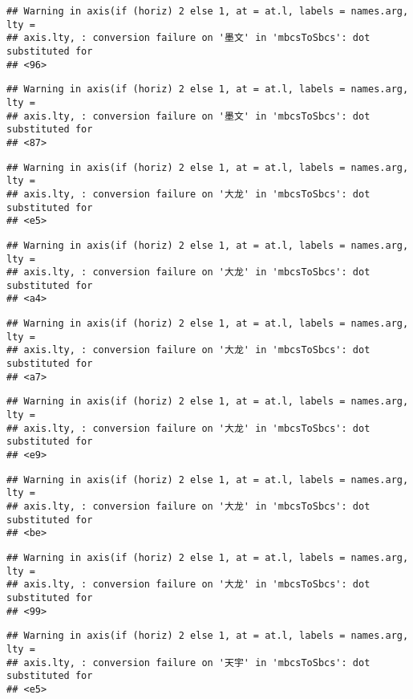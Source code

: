\documentclass[
]{article}
\begin{document}
\begin{verbatim}
## Warning in axis(if (horiz) 2 else 1, at = at.l, labels = names.arg, lty =
## axis.lty, : conversion failure on '墨文' in 'mbcsToSbcs': dot substituted for
## <96>
\end{verbatim}

\begin{verbatim}
## Warning in axis(if (horiz) 2 else 1, at = at.l, labels = names.arg, lty =
## axis.lty, : conversion failure on '墨文' in 'mbcsToSbcs': dot substituted for
## <87>
\end{verbatim}

\begin{verbatim}
## Warning in axis(if (horiz) 2 else 1, at = at.l, labels = names.arg, lty =
## axis.lty, : conversion failure on '大龙' in 'mbcsToSbcs': dot substituted for
## <e5>
\end{verbatim}

\begin{verbatim}
## Warning in axis(if (horiz) 2 else 1, at = at.l, labels = names.arg, lty =
## axis.lty, : conversion failure on '大龙' in 'mbcsToSbcs': dot substituted for
## <a4>
\end{verbatim}

\begin{verbatim}
## Warning in axis(if (horiz) 2 else 1, at = at.l, labels = names.arg, lty =
## axis.lty, : conversion failure on '大龙' in 'mbcsToSbcs': dot substituted for
## <a7>
\end{verbatim}

\begin{verbatim}
## Warning in axis(if (horiz) 2 else 1, at = at.l, labels = names.arg, lty =
## axis.lty, : conversion failure on '大龙' in 'mbcsToSbcs': dot substituted for
## <e9>
\end{verbatim}

\begin{verbatim}
## Warning in axis(if (horiz) 2 else 1, at = at.l, labels = names.arg, lty =
## axis.lty, : conversion failure on '大龙' in 'mbcsToSbcs': dot substituted for
## <be>
\end{verbatim}

\begin{verbatim}
## Warning in axis(if (horiz) 2 else 1, at = at.l, labels = names.arg, lty =
## axis.lty, : conversion failure on '大龙' in 'mbcsToSbcs': dot substituted for
## <99>
\end{verbatim}

\begin{verbatim}
## Warning in axis(if (horiz) 2 else 1, at = at.l, labels = names.arg, lty =
## axis.lty, : conversion failure on '天宇' in 'mbcsToSbcs': dot substituted for
## <e5>
\end{verbatim}
\end{document}
